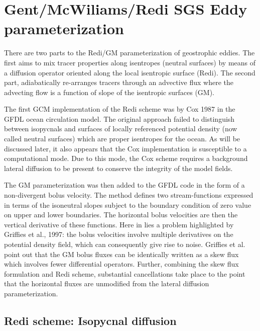 \section{Gent/McWiliams/Redi SGS Eddy parameterization}

There are two parts to the Redi/GM parameterization of geostrophic
eddies. The first aims to mix tracer properties along isentropes
(neutral surfaces) by means of a diffusion operator oriented along the
local isentropic surface (Redi). The second part, adiabatically
re-arranges tracers through an advective flux where the advecting flow
is a function of slope of the isentropic surfaces (GM).

The first GCM implementation of the Redi scheme was by Cox 1987 in the
GFDL ocean circulation model. The original approach failed to
distinguish between isopycnals and surfaces of locally referenced
potential density (now called neutral surfaces) which are proper
isentropes for the ocean. As will be discussed later, it also appears
that the Cox implementation is susceptible  to a computational mode.
Due to this mode, the Cox scheme requires a background lateral
diffusion to be present to conserve the integrity of the model fields.

The GM parameterization was then added to the GFDL code in the form of
a non-divergent bolus velocity. The method defines two
stream-functions expressed in terms of the isoneutral slopes subject
to the boundary condition of zero value on upper and lower
boundaries. The horizontal bolus velocities are then the vertical
derivative of these functions. Here in lies a problem highlighted by
Griffies et al., 1997: the bolus velocities involve multiple
derivatives on the potential density field, which can consequently
give rise to noise. Griffies et al. point out that the GM bolus fluxes
can be identically written as a skew flux which involves fewer
differential operators. Further, combining the skew flux formulation
and Redi scheme, substantial cancellations take place to the point
that the horizontal fluxes are unmodified from the lateral diffusion
parameterization.

\subsection{Redi scheme: Isopycnal diffusion}

